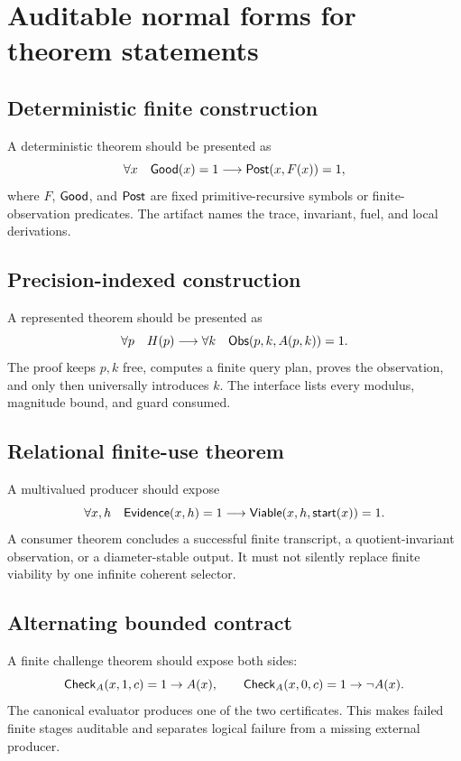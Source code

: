 \appendix
\section{Auditable normal forms for theorem statements}

\subsection{Deterministic finite construction}

A deterministic theorem should be presented as
\[
  \forall x\quad \mathsf{Good}(x)=1\longrightarrow
  \mathsf{Post}(x,F(x))=1,
\]
where \(F\), \(\mathsf{Good}\), and \(\mathsf{Post}\) are fixed primitive-recursive symbols or finite-observation predicates.  The artifact names the trace, invariant, fuel, and local derivations.

\subsection{Precision-indexed construction}

A represented theorem should be presented as
\[
  \forall p\quad H(p)\longrightarrow
  \forall k\quad \mathsf{Obs}(p,k,A(p,k))=1.
\]
The proof keeps \(p,k\) free, computes a finite query plan, proves the observation, and only then universally introduces \(k\).  The interface lists every modulus, magnitude bound, and guard consumed.

\subsection{Relational finite-use theorem}

A multivalued producer should expose
\[
  \forall x,h\quad \mathsf{Evidence}(x,h)=1\longrightarrow
  \mathsf{Viable}(x,h,\mathsf{start}(x))=1.
\]
A consumer theorem concludes a successful finite transcript, a quotient-invariant observation, or a diameter-stable output.  It must not silently replace finite viability by one infinite coherent selector.

\subsection{Alternating bounded contract}

A finite challenge theorem should expose both sides:
\[
 \mathsf{Check}_A(x,1,c)=1\to A(x),\qquad
 \mathsf{Check}_A(x,0,c)=1\to\neg A(x).
\]
The canonical evaluator produces one of the two certificates.  This makes failed finite stages auditable and separates logical failure from a missing external producer.

